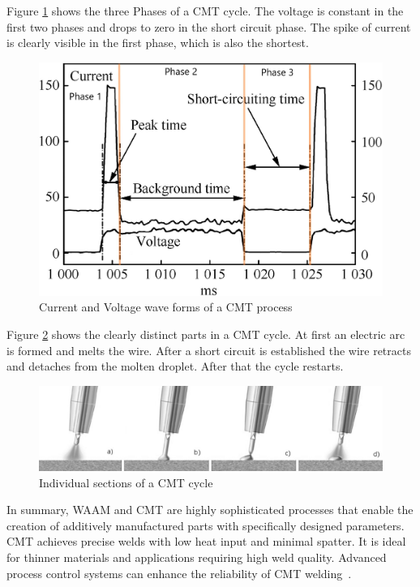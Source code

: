 Figure \ref{fig:CMT} shows the three Phases of a \acrshort{CMT} cycle. The voltage is constant in the first two phases and drops to zero in the short circuit phase. The spike of current is clearly visible in the first phase, which is also the shortest.

\begin{figure}[H]
	\centering
	\includegraphics[width=0.7\linewidth]{figures/CMT.jpg}
	\caption{Current and Voltage wave forms of a CMT process~\cite{Selvi.2018}}
	\label{fig:CMT}
\end{figure}

\newpage
Figure \ref{fig:CMT2} shows the clearly distinct parts in a \acrshort{CMT} cycle. At first an electric arc is formed and melts the wire. After a short circuit is established the wire retracts and detaches from the molten droplet. After that the cycle restarts.

\begin{figure}[H]
	\centering
	\includegraphics[width=0.9\linewidth]{figures/CMT2.png}
	\caption{Individual sections of a CMT cycle~\cite{Dalton.28102023}}
	\label{fig:CMT2}
\end{figure}


In summary, \acrshort{WAAM} and \acrshort{CMT} are highly sophisticated processes that enable the creation of additively manufactured parts with specifically designed parameters. \acrshort{CMT} achieves precise welds with low heat input and minimal spatter. It is ideal for thinner materials and applications requiring high weld quality. Advanced process control systems can enhance the reliability of \acrshort{CMT} welding~\cite{Rahul.2018, Pickin.2011}.


